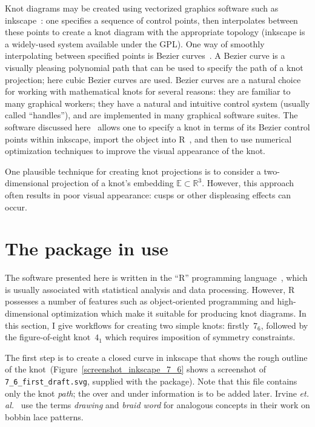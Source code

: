 \documentclass{birkjour}
\theoremstyle{definition}
\theoremstyle{remark}
\numberwithin{equation}{section}
\begin{document}
Knot diagrams may be created using vectorized graphics software such
as inkscape~\cite{Inkscape}: one specifies a sequence of control
points, then interpolates between these points to create a knot
diagram with the appropriate topology (inkscape is a widely-used
system available under the GPL).  One way of smoothly interpolating
between specified points is Bezier curves~\cite{olsen2014}.  A Bezier
curve is a visually pleasing polynomial path that can be used to
specify the path of a knot projection; here cubic Bezier curves are
used.  Bezier curves are a natural choice for working with
mathematical knots for several reasons: they are familiar to many
graphical workers; they have a natural and intuitive control system
(usually called ``handles''), and are implemented in many graphical
software suites.  The software discussed here~\cite{hankin2020} allows
one to specify a knot in terms of its Bezier control points within
inkscape, import the object into R~\cite{rcore2021}, and then to use
numerical optimization techniques to improve the visual appearance of
the knot.

One plausible technique for creating knot projections is to consider a
two-dimensional projection of a knot's embedding
$\mathbb{E}\subset\mathbb{R}^3$.  However, this approach often results in
poor visual appearance: cusps or other displeasing effects can occur.

\section{The package in use}

The software presented here is written in the ``R'' programming
language~\cite{rcore2021}, which is usually associated with
statistical analysis and data processing.  However, R possesses a
number of features such as object-oriented programming and
high-dimensional optimization which make it suitable for producing
knot diagrams.  In this section, I give workflows for creating two
simple knots: firstly~$7_6$, followed by the figure-of-eight
knot~$4_1$ which requires imposition of symmetry constraints.

The first step is to create a closed curve in inkscape that shows the
rough outline of the knot~(Figure~\ref{screenshot_inkscape_7_6} shows
a screenshot of {\tt 7\_6\_first\_draft.svg}, supplied with the
package).  Note that this file contains only the knot {\em path}; the
over and under information is to be added later.  Irvine {\em
  et. al.}~\cite{irvine2020} use the terms {\em drawing} and {\em
  braid word} for analogous concepts in their work on bobbin lace
patterns.
\end{document}
